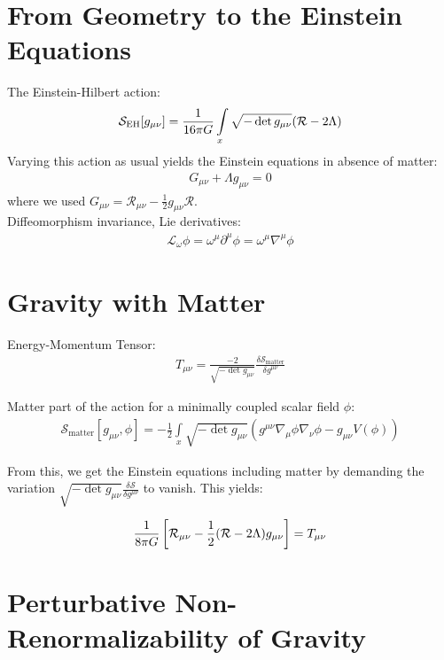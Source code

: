\blindtext


\section{From Geometry to the Einstein Equations}
\Blindtext
The Einstein-Hilbert action:
\begin{align}
	\mathcal{S}_{\text{EH}}[g_{\mu\nu}] = \frac{1}{16\pi G} \int\limits_x \sqrt{-\operatorname{det}g_{\mu\nu}} (\mathcal{R} - 2\Lambda)
\end{align}
Varying this action as usual yields the Einstein equations in absence of matter:
\begin{align}
	G_{\mu\nu} + \Lambda g_{\mu\nu} = 0
\end{align}
where we used $G_{\mu\nu} = \mathcal{R}_{\mu\nu} - \frac{1}{2}g_{\mu\nu}\mathcal{R}$. \\

Diffeomorphism invariance, Lie derivatives:
\begin{align}
	\mathcal{L}_{\omega}\phi = \omega^{\mu}\partial^{\mu}\phi = \omega^{\mu}\nabla^{\mu}\phi
\end{align}

\section{Gravity with Matter} 

Energy-Momentum Tensor:
\begin{align}
	T_{\mu\nu} = \frac{-2}{\sqrt{-\operatorname{det}g_{\mu\nu}}} \frac{\delta\mathcal{S}_{\text{matter}}}{\delta g^{\mu\nu}}
\end{align}

Matter part of the action for a minimally coupled scalar field $\phi$:
\begin{align}
	\mathcal{S}_{\text{matter}}[g_{\mu\nu}, \phi] = -\frac{1}{2} \int\limits_x \sqrt{-\operatorname{det}g_{\mu\nu}}\left( g^{\mu\nu}\nabla_{\mu}\phi\nabla_{\nu}\phi - g_{\mu\nu} V(\phi) \right)
\end{align}

From this, we get the Einstein equations including matter by demanding the variation $\sqrt{-\operatorname{det}g_{\mu\nu}}\frac{\delta\mathcal{S}}{\delta g^{\mu\nu}}$ to vanish. This yields:

\begin{align}
\frac{1}{8\pi G}\left[\mathcal{R}_{\mu\nu} - \frac{1}{2}(\mathcal{R} - 2\Lambda)g_{\mu\nu}\right] = T_{\mu\nu}	
\end{align}


\section{Perturbative Non-Renormalizability of Gravity}

\blindtext
